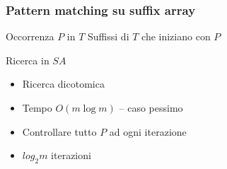 \begin{frame}[fragile]
\begin{columns}
\begin{column}{0.5\textwidth}
\begin{center}
\end{center}
\end{column}
\end{columns}
\end{frame}

\begin{frame}[fragile]
\frametitle{Pattern matching su suffix array}
\begin{block}{Occorrenza $P$ in $T$}
Suffissi di $T$ che iniziano con $P$
\end{block}
\begin{block}{Ricerca in $SA$}
\begin{itemize}
\item
Ricerca dicotomica
\item
Tempo $O(m \log m)$ -- caso pessimo
\item
Controllare tutto $P$ ad ogni iterazione
\item
$log_{2} m$ iterazioni
\end{itemize}
\end{block}
\end{frame}

